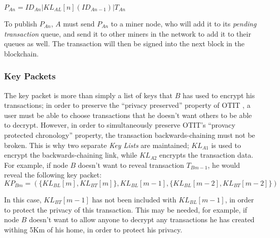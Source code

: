 \documentclass[12pt]{article}
\begin{document}
$P_{An} = ID_{An}|KL_{AL}[n](ID_{An-1})|T_{An}$

To publish $P_{An}$, $A$ must send $P_{An}$ to a miner node, who will add it to its \textit{pending transaction} queue, and send it to other miners in the network to add it to their queues as well. The transaction will then be signed into the next block in the blockchain.

\subsubsection{Key Packets} \label{sssec:key_packets}
The key packet is more than simply a list of keys that $B$ has used to encrypt his transactions; in order to preserve the ``privacy preserved'' property of OTIT \cite{otit}, a user must be able to choose transactions that he doesn't want others to be able to decrypt. However, in order to simultaneously preserve OTIT's ``provacy protected chronology'' property, the transaction backwards-chaining must not be broken. This is why two separate \textit{Key Lists} are maintained; $KL_{A1}$ is used to encrypt the backwards-chaining link, while $KL_{A2}$ encrypts the transaction data. For example, if node $B$ doesn't want to reveal transaction $T_{Bm-1}$, he would reveal the following key packet:
\\

\noindent
${KP_{Bm} = (\{KL_{BL}[m], KL_{BT}[m]\}, KL_{BL}[m-1], \{KL_{BL}[m-2], KL_{BT}[m-2]\})}$

\null
In this case, $KL_{BT}[m-1]$ has not been included with $KL_{BL}[m-1]$, in order to protect the privacy of this transaction. This may be needed, for example, if node $B$ doesn't want to allow anyone to decrypt any transactions he has created withing 5Km of his home, in order to protect his privacy.
\end{document}
